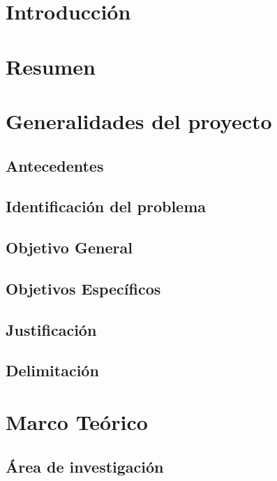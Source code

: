\documentclass{extbook}
\begin{document}


\tableofcontents
\listoffigures
\listoftables

\chapter{Introducción}
% 
\chapter{Resumen}

\chapter{Generalidades del proyecto}
  \section{Antecedentes}
    
    
    
  \section{Identificación del problema}
    
  \section{Objetivo General}
    
  \section{Objetivos Específicos}
    
  \section{Justificación}
    
  \section{Delimitación}
    

\chapter{Marco Teórico}
  \section{Área de investigación}
    
    
\end{document}
